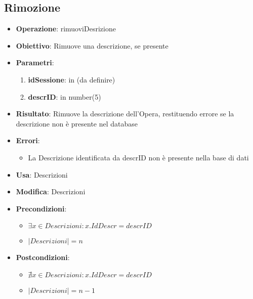\subsection{Rimozione}
\begin{itemize}
	\item \textbf{Operazione}: rimuoviDesrizione
	\item \textbf{Obiettivo}: Rimuove una descrizione, se presente
	\item \textbf{Parametri}:
	\begin{enumerate}
		\item \textbf{idSessione}: in (da definire)
		\item \textbf{descrID}: in number(5)
	\end{enumerate}
	\item \textbf{Risultato}: Rimuove la descrizione dell'Opera, restituendo errore se la descrizione non è presente nel database
	\item \textbf{Errori}: 
	\begin{itemize}
		\item La Descrizione identificata da descrID non è presente nella base di dati
	\end{itemize}
	\item \textbf{Usa}: Descrizioni
	\item \textbf{Modifica}: Descrizioni
	\item \textbf{Precondizioni}:
	\begin{itemize}
		\item $\exists x \in Descrizioni : x.IdDescr = descrID$
		\item $|Descrizioni| = n$
	\end{itemize}
	\item \textbf{Postcondizioni}:
	\begin{itemize}
		\item $\nexists x \in Descrizioni : x.IdDescr = descrID$
		\item $|Descrizioni| = n - 1$
	\end{itemize}
\end{itemize}

